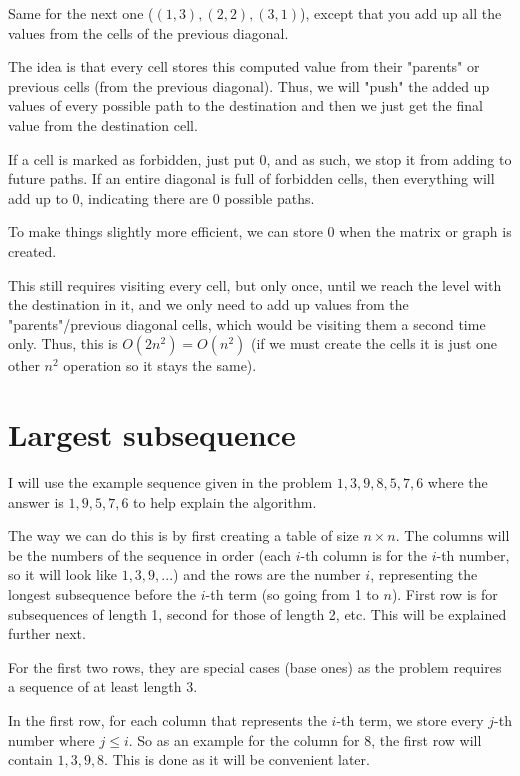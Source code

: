 \documentclass[11pt,letterpaper]{article}
\begin{document}
		Same for the next one ($(1,3), (2,2), (3,1)$), except that you add up all the values from the cells of the previous diagonal.
		
		The idea is that every cell stores this computed value from their "parents" or previous cells (from the previous diagonal).
		Thus, we will "push" the added up values of every possible path to the destination and then we just get the final value from the destination cell.
		
		If a cell is marked as forbidden, just put 0, and as such, we stop it from adding to future paths. If an entire diagonal is full of forbidden cells, then everything will add up to 0, indicating there are 0 possible paths.
		
		To make things slightly more efficient, we can store 0 when the matrix or graph is created.
		
		This still requires visiting every cell, but only once, until we reach the level with the destination in it, and we only need to add up values from the "parents"/previous diagonal cells, which would be visiting them a second time only. Thus, this is $O(2n^2)=O(n^2)$ (if we must create the cells it is just one other $n^2$ operation so it stays the same).
	
	\section{Largest subsequence}
		I will use the example sequence given in the problem $1, 3, 9, 8, 5, 7, 6$ where the answer is $1, 9, 5, 7, 6$ to help explain the algorithm.
		
		The way we can do this is by first creating a table of size $n \times n$.
		The columns will be the numbers of the sequence in order (each $i$-th column is for the $i$-th number, so it will look like $1, 3, 9, ...$) and the rows are the number $i$, representing the longest subsequence before the $i$-th term (so going from 1 to $n$).
		First row is for subsequences of length 1, second for those of length 2, etc.
		This will be explained further next.
		
		For the first two rows, they are special cases (base ones) as the problem requires a sequence of at least length 3.
		
		In the first row, for each column that represents the $i$-th term, we store every $j$-th number where $j \le i$.
		So as an example for the column for 8, the first row will contain $1,3,9,8$.
		This is done as it will be convenient later.
		
\end{document}
